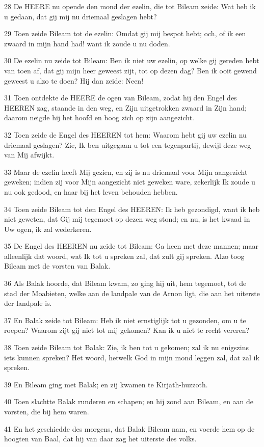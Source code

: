 \par 28 De HEERE nu opende den mond der ezelin, die tot Bileam zeide: Wat heb ik u gedaan, dat gij mij nu driemaal geslagen hebt?
\par 29 Toen zeide Bileam tot de ezelin: Omdat gij mij bespot hebt; och, of ik een zwaard in mijn hand had! want ik zoude u nu doden.
\par 30 De ezelin nu zeide tot Bileam: Ben ik niet uw ezelin, op welke gij gereden hebt van toen af, dat gij mijn heer geweest zijt, tot op dezen dag? Ben ik ooit gewend geweest u alzo te doen? Hij dan zeide: Neen!
\par 31 Toen ontdekte de HEERE de ogen van Bileam, zodat hij den Engel des HEEREN zag, staande in den weg, en Zijn uitgetrokken zwaard in Zijn hand; daarom neigde hij het hoofd en boog zich op zijn aangezicht.
\par 32 Toen zeide de Engel des HEEREN tot hem: Waarom hebt gij uw ezelin nu driemaal geslagen? Zie, Ik ben uitgegaan u tot een tegenpartij, dewijl deze weg van Mij afwijkt.
\par 33 Maar de ezelin heeft Mij gezien, en zij is nu driemaal voor Mijn aangezicht geweken; indien zij voor Mijn aangezicht niet geweken ware, zekerlijk Ik zoude u nu ook gedood, en haar bij het leven behouden hebben.
\par 34 Toen zeide Bileam tot den Engel des HEEREN: Ik heb gezondigd, want ik heb niet geweten, dat Gij mij tegemoet op dezen weg stond; en nu, is het kwaad in Uw ogen, ik zal wederkeren.
\par 35 De Engel des HEEREN nu zeide tot Bileam: Ga heen met deze mannen; maar alleenlijk dat woord, wat Ik tot u spreken zal, dat zult gij spreken. Alzo toog Bileam met de vorsten van Balak.
\par 36 Als Balak hoorde, dat Bileam kwam, zo ging hij uit, hem tegemoet, tot de stad der Moabieten, welke aan de landpale van de Arnon ligt, die aan het uiterste der landpale is.
\par 37 En Balak zeide tot Bileam: Heb ik niet ernstiglijk tot u gezonden, om u te roepen? Waarom zijt gij niet tot mij gekomen? Kan ik u niet te recht vereren?
\par 38 Toen zeide Bileam tot Balak: Zie, ik ben tot u gekomen; zal ik nu enigszins iets kunnen spreken? Het woord, hetwelk God in mijn mond leggen zal, dat zal ik spreken.
\par 39 En Bileam ging met Balak; en zij kwamen te Kirjath-huzzoth.
\par 40 Toen slachtte Balak runderen en schapen; en hij zond aan Bileam, en aan de vorsten, die bij hem waren.
\par 41 En het geschiedde des morgens, dat Balak Bileam nam, en voerde hem op de hoogten van Baal, dat hij van daar zag het uiterste des volks.

